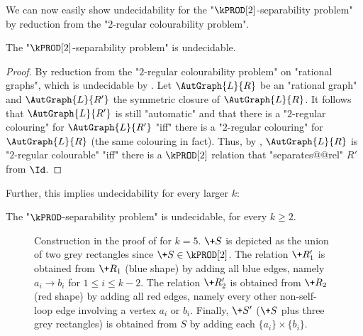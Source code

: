 We can now easily show undecidability for the "$\kPROD[2]$-separability problem" by reduction from the "$2$-regular colourability problem".
\begin{lemma}\AP\label{lem:aut-2prod-sep-undec}
    The "$\kPROD[2]$-separability problem" is undecidable.
\end{lemma}
\begin{proof}
    By reduction from the "$2$-regular colourability problem" on "rational graphs", which is undecidable by . Let $\AutGraph{L}{R}$ be an "rational graph" and $\AutGraph{L}{R'}$ the symmetric closure of $\AutGraph{L}{R}$. It follows that $\AutGraph{L}{R'}$ is still "automatic" and that there is a "$2$-regular colouring" for $\AutGraph{L}{R'}$ "iff" there is a "$2$-regular colouring" for $\AutGraph{L}{R}$ (the same colouring in fact).
    Thus, by , $\AutGraph{L}{R}$ is "$2$-regular colourable" "iff" 
    there is a $\kPROD[2]$ relation that "separates@@rel" $R'$ from $\Id$.
\end{proof}

Further, this implies undecidability for every larger $k$:
\begin{theorem}
    \AP\label{thm:kprod-undecidable}
    The "$\kPROD$-separability problem" is undecidable, for every $k \geq 2$.
\end{theorem}

\begin{figure}
    \centering
    \begin{tikzpicture}
        
    \end{tikzpicture}
    \caption{
        \AP\label{fig:2prod-to-kprod}
        Construction in the proof of  for $k = 5$. $\+S$ is depicted as the union of two grey rectangles since $\+S \in \kPROD[2]$.
        The relation $\+R'_1$ is obtained from $\+R_1$ (blue shape) by adding all blue edges,
        namely $a_i \to b_i$ for $1\leq i \leq k-2$. The relation $\+R'_2$ is obtained from $\+R_2$ (red shape) by adding
        all red edges, namely every other non-self-loop edge involving a vertex $a_i$ or $b_i$.
        Finally, $\+S'$ ($\+S$ plus three grey rectangles) is obtained from $S$ by adding
        each $\{a_i\} \times \{b_i\}$.
    }
\end{figure}


